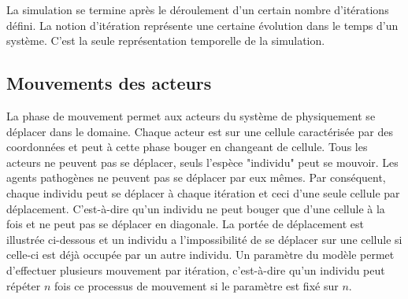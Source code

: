 La simulation se termine après le déroulement d'un certain nombre d'itérations défini. La notion d'itération représente une certaine évolution dans le temps d'un système. C'est la seule représentation temporelle de la simulation.

\subsection{Mouvements des acteurs}

La phase de mouvement permet aux acteurs du système de physiquement se déplacer dans le domaine. Chaque acteur est sur une cellule caractérisée par des coordonnées et peut à cette phase bouger en changeant de cellule. Tous les acteurs ne peuvent pas se déplacer, seuls l'espèce "individu" peut se mouvoir. Les agents pathogènes ne peuvent pas se déplacer par eux mêmes. Par conséquent, chaque individu peut se déplacer à chaque itération et ceci d'une seule cellule par déplacement. C'est-à-dire qu'un individu ne peut bouger que d'une cellule à la fois et ne peut pas se déplacer en diagonale. La portée de déplacement est illustrée ci-dessous et un individu a l'impossibilité de se déplacer sur une cellule si celle-ci est déjà occupée par un autre individu. Un paramètre du modèle permet d'effectuer plusieurs mouvement par itération, c'est-à-dire qu'un individu peut répéter $n$ fois ce processus de mouvement si le paramètre est fixé sur $n$.\\

